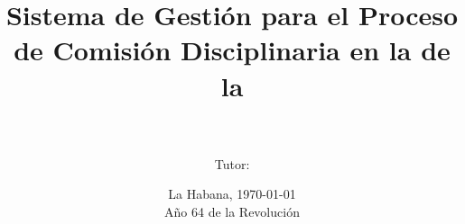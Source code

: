 \documentclass[12pt]{report}
\title{
	\ucilogo
	Sistema de Gestión para el Proceso de Comisión Disciplinaria en la \Fac de la \uci 
}
\author{\autorA \\ \autorB \\ Tutor: \tutorA}
\date{\vspace{2in} La Habana, \today\\  Año 64 de la Revolución}
\begin{document}
  \maketitle
  
  
  
  
  
  
  \tableofcontents
  \listoffigures
  \listoftables
  \pagebreak
  
  
  
  
  
  
  \appendix
  
  
  
\end{document}
